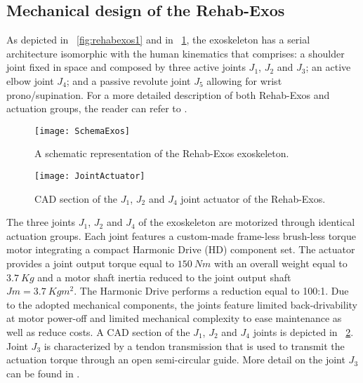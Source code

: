 \subsection{Mechanical design of the Rehab-Exos} 
\label{subsec:mechanicalDesign}
As depicted in \figurename \ \ref{fig:rehabexos1} and in \figurename \ \ref{fig:rehabexosSchema}, the exoskeleton has a serial architecture isomorphic with the human kinematics that comprises: a shoulder joint  fixed in space and composed by three active joints $J_1$, $J_2$ and $J_3$; an active elbow joint $J_4$; and a passive revolute joint $J_5$ allowing for wrist prono/supination.  For a more detailed description of both Rehab-Exos and actuation groups, the reader can refer to \cite{vertechy2009development}.
\begin{figure}[]
	\centering
	\texttt{[image: SchemaExos]}
	\caption{A schematic representation of the Rehab-Exos exoskeleton.}
	\label{fig:rehabexosSchema}
\end{figure}
%
%
\begin{figure}[]
	\centering
	\texttt{[image: JointActuator]}
	\caption{CAD section of the $J_1$, $J_2$ and $J_4$ joint actuator of the Rehab-Exos.}
	\label{fig:exosActuatorCAD}
\end{figure}
%
\par The three joints $J_1$, $J_2$ and $J_4$ of the exoskeleton are motorized through identical actuation groups. Each joint features a custom-made frame-less brush-less torque motor integrating a compact Harmonic Drive (HD) component set. The actuator provides a joint output torque equal to $150\ Nm$ with an overall weight equal to $3.7\ Kg$ and a motor shaft inertia reduced to the joint output shaft $Jm = 3.7\ Kgm^2$. The Harmonic Drive performs a reduction equal to 100:1. Due to the adopted mechanical components, the joints feature limited back-drivability at motor power-off and limited mechanical complexity to ease maintenance as well as reduce costs. A CAD section of the $J_1$, $J_2$ and $J_4$ joints is depicted in \figurename \ \ref{fig:exosActuatorCAD}.
Joint $J_3$ is characterized by a tendon transmission that is used to transmit the actuation torque through an open semi-circular guide. More detail on the joint $J_3$ can be found in \cite{vertechy2009development}.

